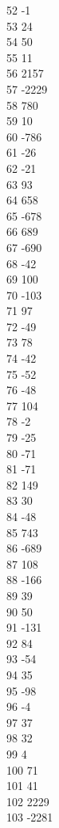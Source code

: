 { 52	-1 \\
 53	24 \\
 54	50 \\
 55	11 \\
 56	2157 \\
 57	-2229 \\
 58	780 \\
 59	10 \\
 60	-786 \\
 61	-26 \\
 62	-21 \\
 63	93 \\
 64	658 \\
 65	-678 \\
 66	689 \\
 67	-690 \\
 68	-42 \\
 69	100 \\
 70	-103 \\
 71	97 \\
 72	-49 \\
 73	78 \\
 74	-42 \\
 75	-52 \\
 76	-48 \\
 77	104 \\
 78	-2 \\
 79	-25 \\
 80	-71 \\
 81	-71 \\
 82	149 \\
 83	30 \\
 84	-48 \\
 85	743 \\
 86	-689 \\
 87	108 \\
 88	-166 \\
 89	39 \\
 90	50 \\
 91	-131 \\
 92	84 \\
 93	-54 \\
 94	35 \\
 95	-98 \\
 96	-4 \\
 97	37 \\
 98	32 \\
 99	4 \\
 100	71 \\
 101	41 \\
 102	2229 \\
 103	-2281 \\
}
